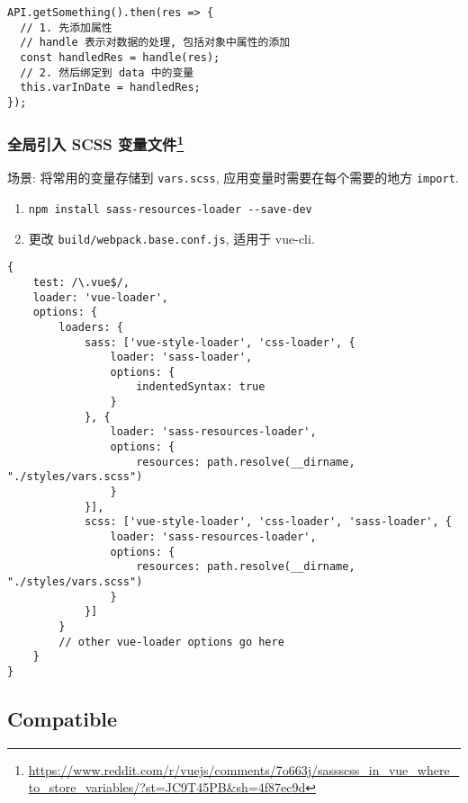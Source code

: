 \begin{lstlisting}
API.getSomething().then(res => {
  // 1. 先添加属性
  // handle 表示对数据的处理, 包括对象中属性的添加
  const handledRes = handle(res);
  // 2. 然后绑定到 data 中的变量
  this.varInDate = handledRes;
});
\end{lstlisting}

\subsubsection[全局引入 SCSS 变量文件]{\texorpdfstring{全局引入 SCSS
变量文件\footnote{\url{https://www.reddit.com/r/vuejs/comments/7o663j/sassscss_in_vue_where_to_store_variables/?st=JC9T45PB\&sh=4f87ec9d}}}{全局引入 SCSS 变量文件}}\label{ux5168ux5c40ux5f15ux5165-scss-ux53d8ux91cfux6587ux4ef6vueglobalimportvariablesfile}

场景: 将常用的变量存储到 \lstinline!vars.scss!,
应用变量时需要在每个需要的地方 \lstinline!import!.

\begin{enumerate}
\def\labelenumi{\arabic{enumi}.}
\tightlist
\item
  \lstinline!npm install sass-resources-loader --save-dev!
\item
  更改 \lstinline!build/webpack.base.conf.js!, 适用于 vue-cli.
\end{enumerate}

\begin{lstlisting}
{
    test: /\.vue$/,
    loader: 'vue-loader',
    options: {
        loaders: {
            sass: ['vue-style-loader', 'css-loader', {
                loader: 'sass-loader',
                options: {
                    indentedSyntax: true
                }
            }, {
                loader: 'sass-resources-loader',
                options: {
                    resources: path.resolve(__dirname, "./styles/vars.scss")
                }
            }],
            scss: ['vue-style-loader', 'css-loader', 'sass-loader', {
                loader: 'sass-resources-loader',
                options: {
                    resources: path.resolve(__dirname, "./styles/vars.scss")
                }
            }]
        }
        // other vue-loader options go here
    }
}
\end{lstlisting}

\subsection{Compatible}\label{compatible}

